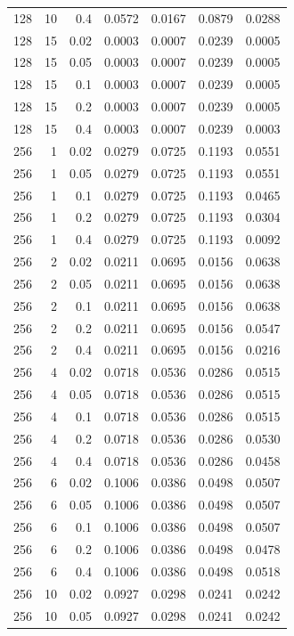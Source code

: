 \begin{table}[t]
\begin{tabular}{lrrrrrr}
128 & 10 & 0.4 & 0.0572 & 0.0167 & 0.0879 & 0.0288 \\
128 & 15 & 0.02 & 0.0003 & 0.0007 & 0.0239 & 0.0005 \\
128 & 15 & 0.05 & 0.0003 & 0.0007 & 0.0239 & 0.0005 \\
128 & 15 & 0.1 & 0.0003 & 0.0007 & 0.0239 & 0.0005 \\
128 & 15 & 0.2 & 0.0003 & 0.0007 & 0.0239 & 0.0005 \\
128 & 15 & 0.4 & 0.0003 & 0.0007 & 0.0239 & 0.0003 \\
256 & 1 & 0.02 & 0.0279 & 0.0725 & 0.1193 & 0.0551 \\
256 & 1 & 0.05 & 0.0279 & 0.0725 & 0.1193 & 0.0551 \\
256 & 1 & 0.1 & 0.0279 & 0.0725 & 0.1193 & 0.0465 \\
256 & 1 & 0.2 & 0.0279 & 0.0725 & 0.1193 & 0.0304 \\
256 & 1 & 0.4 & 0.0279 & 0.0725 & 0.1193 & 0.0092 \\
256 & 2 & 0.02 & 0.0211 & 0.0695 & 0.0156 & 0.0638 \\
256 & 2 & 0.05 & 0.0211 & 0.0695 & 0.0156 & 0.0638 \\
256 & 2 & 0.1 & 0.0211 & 0.0695 & 0.0156 & 0.0638 \\
256 & 2 & 0.2 & 0.0211 & 0.0695 & 0.0156 & 0.0547 \\
256 & 2 & 0.4 & 0.0211 & 0.0695 & 0.0156 & 0.0216 \\
256 & 4 & 0.02 & 0.0718 & 0.0536 & 0.0286 & 0.0515 \\
256 & 4 & 0.05 & 0.0718 & 0.0536 & 0.0286 & 0.0515 \\
256 & 4 & 0.1 & 0.0718 & 0.0536 & 0.0286 & 0.0515 \\
256 & 4 & 0.2 & 0.0718 & 0.0536 & 0.0286 & 0.0530 \\
256 & 4 & 0.4 & 0.0718 & 0.0536 & 0.0286 & 0.0458 \\
256 & 6 & 0.02 & 0.1006 & 0.0386 & 0.0498 & 0.0507 \\
256 & 6 & 0.05 & 0.1006 & 0.0386 & 0.0498 & 0.0507 \\
256 & 6 & 0.1 & 0.1006 & 0.0386 & 0.0498 & 0.0507 \\
256 & 6 & 0.2 & 0.1006 & 0.0386 & 0.0498 & 0.0478 \\
256 & 6 & 0.4 & 0.1006 & 0.0386 & 0.0498 & 0.0518 \\
256 & 10 & 0.02 & 0.0927 & 0.0298 & 0.0241 & 0.0242 \\
256 & 10 & 0.05 & 0.0927 & 0.0298 & 0.0241 & 0.0242 \\

\end{tabular}
\end{table}
